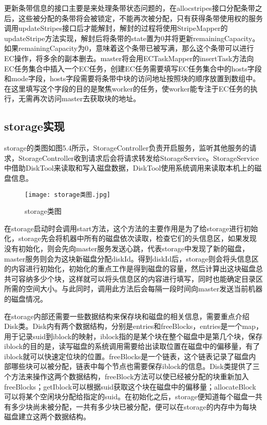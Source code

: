 更新条带信息的接口主要是来处理条带状态问题的，在allocstripes接口分配条带之后，这些被分配的条带将会被锁定，不能再次被分配，只有获得条带使用权的服务调用updateStripes接口后才能解封，解封的过程将使用StripeMapper的updateStripe方法实现，解封后将条带的state置为0并将更新remainingCapacity。如果remainingCapacity为0，意味着这个条带已被写满，那么这个条带可以进行EC操作，将多余的副本删去。master将会用ECTaskMapper的insertTask方法向EC任务集合中插入一个EC任务，创建EC任务需要填写EC任务集合中的hosts字段和mode字段，hosts字段需要将条带中块的访问地址按照块的顺序放置到数组中。在这里填写这个字段的目的是聚焦worker的任务，使worker能专注于EC任务的执行，无需再次访问master去获取块的地址。

\subsection{storage实现}%
storage的类图如图5.4所示，StorageController负责开启服务，监听其他服务的请求，StorageController收到请求后会将请求转发给StorageService。StorageService中借助DiskTool来读取和写入磁盘数据，DiskTool使用系统调用来读取本机上的磁盘信息。

\begin{figure}
  \centering
  \texttt{[image: storage类图.jpg]}
  \caption{storage类图}
\end{figure}


在storage启动时会调用start方法，这个方法的主要作用是为了给storage进行初始化，storage先会将机器中所有的磁盘依次读取，检查它们的头信息区，如果发现没有初始化，则会先向master服务发送心跳，代表storage中发现了新的磁盘，master服务则会为这块新磁盘分配diskId。得到diskId后，storage则会将头信息区的内容进行初始化，初始化的重点工作是得到磁盘的容量，然后计算出这块磁盘总共可容纳多少个块，这样就可以将头信息区的内容进行填写，同时也能确定目录区所需的空间大小。与此同时，调用此方法后会每隔一段时间向master发送当前机器的磁盘情况。

在storage内部还需要一些数据结构来保存块和磁盘的相关信息，需要重点介绍Disk类。Disk内有两个数据结构，分别是entries和freeBlocks，entries是一个map，用于记录suid到iblock的映射，iblock指的是某个块在整个磁盘中是第几个块，保存iblock的目的是，读写磁盘的系统调用需要给出读取位置在磁盘中的偏移量，有了iblock就可以快速定位块的位置。freeBlocks是一个链表，这个链表记录了磁盘内部哪些块可以被分配，链表中每个节点也需要保存iblock的信息。Disk类提供了三个方法来操作这两个数据结构，freeBlock方法可以使已经被分配的块重新加入freeBlocks；getIblock可以根据suid获取这个块在磁盘中的偏移量；allocateBlock可以将某个空闲块分配给指定的suid。在初始化之后，storage便知道每个磁盘一共有多少块尚未被分配，一共有多少块已被分配，便可以在storage的内存中为每块磁盘建立这两个数据结构。

